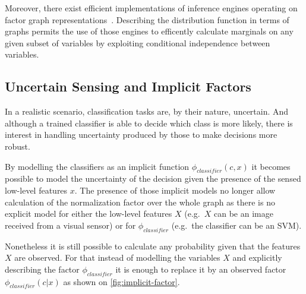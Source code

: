 Moreover, there exist efficient implementations of inference engines operating on factor
graph representations~\cite{Mooij_libDAI_10}.
Describing the distribution function in terms of graphs permits the use of those engines to
efficently calculate marginals on any given subset of variables by exploiting conditional
independence between variables.

\subsection{Uncertain Sensing and Implicit Factors}
\label{sec:cues-from-low-level}
In a realistic scenario, classification tasks are, by their nature, uncertain.
And although a trained classifier is able to decide which class is more likely, there is
interest in handling uncertainty produced by those to make decisions more robust.

By modelling the classifiers as an implicit function $\phi_{classifier}(c, x)$ it becomes
possible to model the uncertainty of the decision given the presence of the sensed low-level
features $x$. The presence of those implicit models no longer allow calculation of the
normalization factor over the whole graph as there is no explicit model for either the
low\hyp{}level features $X$ (e.g.\ $X$ can be an image received from a visual sensor)
or for $\phi_{classifier}$ (e.g.\ the classifier can be an \gls{SVM}).

Nonetheless it is still possible to calculate any probability given that the features $X$
are observed. For that instead of modelling the variables $X$ and explicitly describing
the factor $\phi_{classifier}$ it is enough to replace it by an observed factor
$\phi_{classifier}(c|x)$ as shown on \autoref{fig:implicit-factor}.


